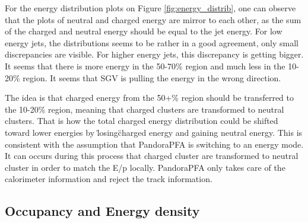 
For the energy distribution plots on Figure \ref{fig:energy_distrib}, one can observe that the plots of neutral and charged energy are mirror to each other, as the sum of the charged and neutral energy should be equal to the jet energy. For low energy jets, the distributions seems to be rather in a good agreement, only small discrepancies are visible. For higher energy jets, this discrepancy is getting bigger. It seems that there is more energy in the 50-70\% region and much less in the 10-20\% region. It seems that SGV is pulling the energy in the wrong direction.

The idea is that charged energy from the 50+\% region should be transferred to the 10-20\% region, meaning that charged clusters are transformed to neutral clusters. That is how the total charged energy distribution could be shifted toward lower energies by \"losing\" charged energy and gaining neutral energy. This is consistent with the assumption that PandoraPFA is switching to an energy mode. It can occurs during this process that charged cluster are transformed to neutral cluster in order to match the E/p locally. PandoraPFA only takes care of the calorimeter information and reject the track information.

\subsection{Occupancy and Energy density}


